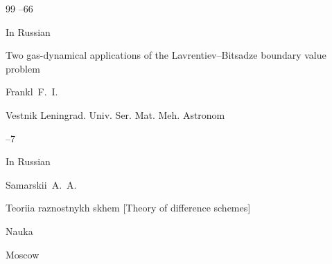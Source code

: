 \begin{thebibliography}{99}
--66




\lang In Russian

\paper Two gas-dynamical applications of the Lavrentiev–Bitsadze boundary value problem

\by Frankl~F.~I.

\jour Vestnik Leningrad. Univ. Ser. Mat. Meh. Astronom




--7








\lang In Russian

\by Samarskii~A.~A.

\book Teoriia raznostnykh skhem \rm [Theory of difference schemes] 


\publ Nauka

\publaddr Moscow




\end{thebibliography}



\renewcommand{\baselinestretch}{0.9}



%

